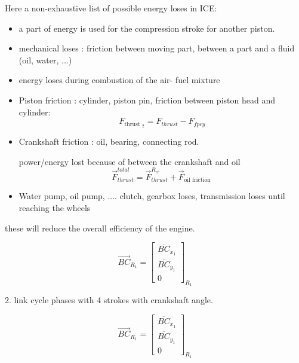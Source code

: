 \documentclass[12pt,a4paper]{article}
\begin{document}
	Here a non-exhaustive list of possible energy loses in ICE:
	\begin{itemize}
		\item a part of energy is used for the compression stroke for another piston. 
		\item mechanical loses : friction between moving part, between a part and a fluid (oil, water, ...)
		\item energy loses during combustion of the air- fuel mixture
		\item Piston friction : cylinder, piston pin,
		friction between piston head and cylinder:
	\begin{equation*}
		F_{\text {thrust }_{2}}=F_{thrust }-F_{fpcy} \tag{4}
	\end{equation*}
		\item Crankshaft friction : oil, bearing, connecting rod.
		
		power/energy lost because of between the crankshaft and oil
		\begin{equation*}
			\vec{F}_{thrust}^{total}=\vec{F}_{thrust}^{R_{c c}}+\vec{F}_{\text{oil friction }} \tag{6}
		\end{equation*}
		\item Water pump, oil pump, .... clutch, gearbox loses, transmission loses until reaching the wheels
	\end{itemize}
	these will reduce the overall efficiency of the engine.
	
	
	
	
	
	\[
	\overrightarrow{B C}_{R_{1}}=\left[\begin{array}{c}
		\overline{B C}_{x_{1}}  \tag{10}\\
		\overline{B C}_{y_{1}} \\
		0
	\end{array}\right]_{R_{1}}
	\]
	
	
	2. link cycle phases with 4 strokes with crankshaft angle. 

	
	\begin{equation}
		\vec{BC}_{R_{1}}=
		\begin{bmatrix}
			\overline{BC}_{x_1} \\
			\overline{BC}_{y_1}\\
			0
		\end{bmatrix}_{R_{1}} 
	\end{equation}
	
\end{document}
